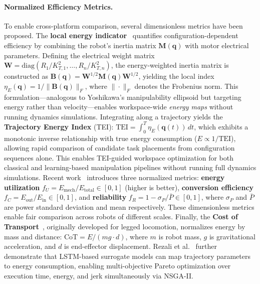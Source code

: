 \documentclass[acmsmall,screen,review,anonymous]{acmart}
\begin{document}
\paragraph{Normalized Efficiency Metrics.}
To enable cross-platform comparison, several dimensionless metrics have been proposed. 
The \textbf{local energy indicator}~\cite{vidussi2021energy} quantifies configuration-dependent efficiency by combining the robot's inertia matrix $\mathbf{M}(\mathbf{q})$ with motor electrical parameters. Defining the electrical weight matrix $\mathbf{W} = \text{diag}(R_1/K_{T,1}^2, \ldots, R_n/K_{T,n}^2)$, the energy-weighted inertia matrix is constructed as $\mathbf{B}(\mathbf{q}) = \mathbf{W}^{1/2}\mathbf{M}(\mathbf{q})\mathbf{W}^{1/2}$, yielding the local index $\eta_E(\mathbf{q}) = 1/\|\mathbf{B}(\mathbf{q})\|_F$, where $\|\cdot\|_F$ denotes the Frobenius norm. This formulation---analogous to Yoshikawa's manipulability ellipsoid but targeting energy rather than velocity---enables workspace-wide \emph{energy maps} without running dynamics simulations. Integrating along a trajectory yields the \textbf{Trajectory Energy Index} (TEI): $\text{TEI} = \int_0^T \eta_E(\mathbf{q}(t))\,dt$, which exhibits a monotonic inverse relationship with true energy consumption ($E \propto 1/\text{TEI}$), allowing rapid comparison of candidate task placements from configuration sequences alone. This enables TEI-guided workspace optimization for both classical and learning-based manipulation pipelines without running full dynamics simulations. Recent work~\cite{heredia2025evaluating} introduces three normalized metrics: \textbf{energy utilization} $f_U = E_{\text{mech}}/E_{\text{total}} \in [0,1]$ (higher is better), \textbf{conversion efficiency} $f_C = E_{\text{out}}/E_{\text{in}} \in [0,1]$, and \textbf{reliability} $f_R = 1 - \sigma_P/\bar{P} \in [0,1]$, where $\sigma_P$ and $\bar{P}$ are power standard deviation and mean respectively. These dimensionless metrics enable fair comparison across robots of different scales. Finally, the \textbf{Cost of Transport}~\cite{tucker1975energetic}, originally developed for legged locomotion, normalizes energy by mass and distance: $\text{CoT} = E/(mg \cdot d)$, where $m$ is robot mass, $g$ is gravitational acceleration, and $d$ is end-effector displacement. Rezali et al.~\cite{rezali2025lstm} further demonstrate that LSTM-based surrogate models can map trajectory parameters to energy consumption, enabling multi-objective Pareto optimization over execution time, energy, and jerk simultaneously via NSGA-II\@.
\end{document}
